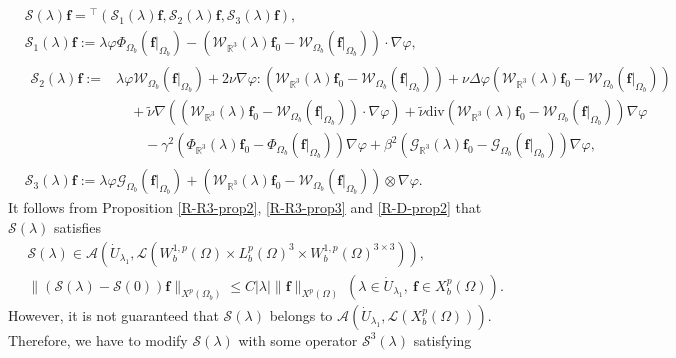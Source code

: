 \documentclass[dvipdfmx,12pt]{article}
\begin{document}
\begin{align*}
&
\mathcal{S}(\lambda)\mathbf{f}={}^\top (\mathcal{S}_1(\lambda)\mathbf{f}, \mathcal{S}_2(\lambda)\mathbf{f},\mathcal{S}_3(\lambda)\mathbf{f}), \\
&
\mathcal{S}_1(\lambda)\mathbf{f}:=\lambda\varphi \Phi_{\Omega_{b}}(\mathbf{f}|_{\Omega_{b}})-(\mathcal{W}_{\mathbb{R}^3}(\lambda)\mathbf{f}_0-\mathcal{W}_{\Omega_{b}}(\mathbf{f}|_{\Omega_{b}}))\cdot\nabla\varphi, \\
&
\begin{aligned}
\mathcal{S}_2(\lambda)\mathbf{f}:=&
\lambda\varphi \mathcal{W}_{\Omega_{b}}(\mathbf{f}|_{\Omega_{b}})+2\nu\nabla\varphi: (\mathcal{W}_{\mathbb{R}^3}(\lambda)\mathbf{f}_0-\mathcal{W}_{\Omega_{b}}(\mathbf{f}|_{\Omega_{b}})) +\nu\Delta\varphi(\mathcal{W}_{\mathbb{R}^3}(\lambda)\mathbf{f}_0-\mathcal{W}_{\Omega_{b}}(\mathbf{f}|_{\Omega_{b}}))  \\
&\quad
+\tilde{\nu}\nabla((\mathcal{W}_{\mathbb{R}^3}(\lambda)\mathbf{f}_0-\mathcal{W}_{\Omega_{b}}(\mathbf{f}|_{\Omega_{b}}))\cdot \nabla\varphi)
+\tilde{\nu}\mathrm{div}(\mathcal{W}_{\mathbb{R}^3}(\lambda)\mathbf{f}_0-\mathcal{W}_{\Omega_{b}}(\mathbf{f}|_{\Omega_{b}}))\nabla\varphi \\
&\qquad -\gamma^2 (\Phi_{\mathbb{R}^3}(\lambda)\mathbf{f}_0-\Phi_{\Omega_{b}}(\mathbf{f}|_{\Omega_{b}}))\nabla\varphi  +\beta^2(\mathcal{G}_{\mathbb{R}^3}(\lambda)\mathbf{f}_0-\mathcal{G}_{\Omega_{b}}(\mathbf{f}|_{\Omega_{b}}))\nabla\varphi,
\end{aligned}
\\
&
\mathcal{S}_3(\lambda)\mathbf{f}:=\lambda\varphi \mathcal{G}_{\Omega_{b}}(\mathbf{f}|_{\Omega_{b}})+(\mathcal{W}_{\mathbb{R}^3}(\lambda)\mathbf{f}_0-\mathcal{W}_{\Omega_{b}}(\mathbf{f}|_{\Omega_{b}}))\otimes  \nabla\varphi.
\end{align*}
It follows from Proposition \ref{R-R3-prop2}, \ref{R-R3-prop3} and \ref{R-D-prop2} that $\mathcal{S}(\lambda)$ satisfies
\begin{align*}
&\mathcal{S}(\lambda)\in \mathcal{A}(\dot{U}_{\lambda_1}, \mathcal{L}(W_b^{1,p}(\Omega)\times L_b^p(\Omega)^3\times W_b^{1,p}(\Omega)^{3\times3})), \\
&\|(\mathcal{S}(\lambda)-\mathcal{S}(0))\mathbf{f}\|_{X^p(\Omega_b)} \le C|\lambda|\|\mathbf{f}\|_{X^p(\Omega)}~(\lambda\in \dot{U}_{\lambda_1},~\mathbf{f}\in X_b^p(\Omega)).
\end{align*}  
However, it is not guaranteed that $\mathcal{S}(\lambda)$ belongs to $\mathcal{A}(\dot{U}_{\lambda_1}, \mathcal{L}(X_b^p(\Omega)) )$. Therefore, we have to modify $\mathcal{S}(\lambda)$ with some operator $\mathcal{S}^3(\lambda)$ satisfying
\end{document}
